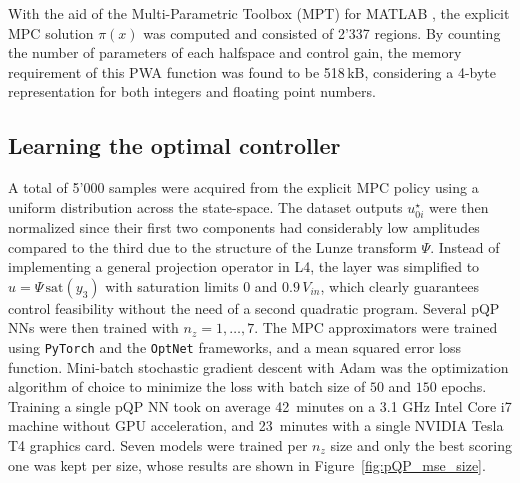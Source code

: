 With the aid of the Multi-Parametric Toolbox (MPT) for MATLAB \citep{herceg2013multi}, the explicit MPC solution $\pi(x)$ was computed and consisted of 2'337 regions. By counting the number of parameters of each halfspace and control gain, the memory requirement of this PWA function was found to be 518$\,$kB, considering a 4-byte representation for both integers and floating point numbers.


\subsection{Learning the optimal controller}

A total of 5'000 samples were acquired from the explicit MPC policy using a uniform distribution across the state-space. The dataset outputs $u_{0i}^\star$ were then normalized since their first two components had considerably low amplitudes compared to the third due to the structure of the Lunze transform $\Psi$. Instead of implementing a general projection operator in L4, the layer was simplified to $u = \Psi \, \text{sat}(y_3)$ with saturation limits $0$ and $0.9 \, V_{in}$, which clearly guarantees control feasibility without the need of a second quadratic program. Several pQP NNs were then trained with $n_z=1,\dots,7$.  The MPC approximators were trained using \texttt{PyTorch} and the \texttt{OptNet} frameworks, and a mean squared error loss function. Mini-batch stochastic gradient descent with Adam \citep{kingma2014adam} was the optimization algorithm of choice to minimize the loss with batch size of $50$ and $150$ epochs. Training a single pQP NN took on average 42~minutes on a 3.1 GHz Intel Core i7 machine without GPU acceleration, and 23~minutes with a single NVIDIA Tesla T4 graphics card. Seven models were trained per $n_z$ size and only the best scoring one was kept per size, whose results are shown in Figure~\ref{fig:pQP_mse_size}.


